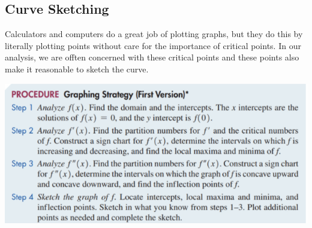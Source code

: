 \documentclass[14pt]{extarticle}
\begin{document}
\subsection{Curve Sketching}
Calculators and computers do a great job of plotting graphs, but they do this by literally plotting points without care for the importance of critical points. In our analysis, we are offten concerned with these critical points and these points also make it reasonable to sketch the curve.

\begin{center}\includegraphics[width=1\linewidth]{11-2-3}\end{center}
\end{document}

